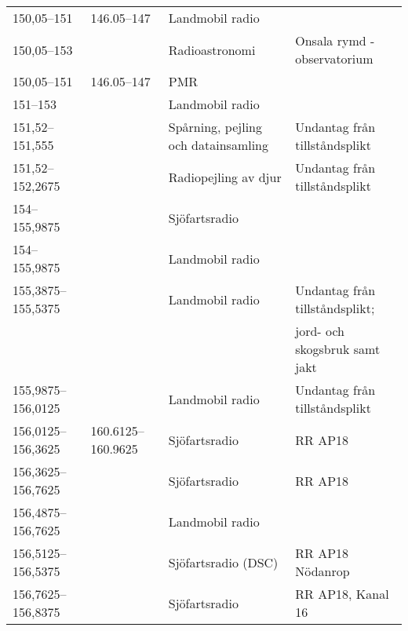 \begin{landscape}
\begin{longtable}{llll}
	150,05--151                            & 146.05--147        & Landmobil radio                       &  \\
	150,05--153                            &                    & Radioastronomi                        & Onsala rymd - observatorium    \\
	150,05--151                            & 146.05--147        & PMR                                   &  \\
	151--153                               &                    & Landmobil radio                       &  \\
	151,52--151,555                        &                    & Spårning, pejling och datainsamling   & Undantag från tillståndsplikt  \\
	151,52--152,2675                       &                    & Radiopejling av djur                  & Undantag från tillståndsplikt  \\
	154--155,9875                          &                    & Sjöfartsradio                         &  \\
	154--155,9875                          &                    & Landmobil radio                       &  \\
	155,3875--155,5375                     &                    & Landmobil radio                       & Undantag från tillståndsplikt; \\
	                                       &                    &                                       & jord- och skogsbruk samt jakt  \\
	155,9875--156,0125                     &                    & Landmobil radio                       & Undantag från tillståndsplikt  \\
	156,0125--156,3625                     & 160.6125--160.9625 & Sjöfartsradio                         & RR AP18                        \\
	156,3625--156,7625                     &                    & Sjöfartsradio                         & RR AP18                        \\
	156,4875--156,7625                     &                    & Landmobil radio                       &  \\
	156,5125--156,5375                     &                    & Sjöfartsradio (DSC)                   & RR AP18 Nödanrop               \\
	156,7625--156,8375                     &                    & Sjöfartsradio                         & RR AP18, Kanal 16              \\

\end{longtable}
\end{landscape}

